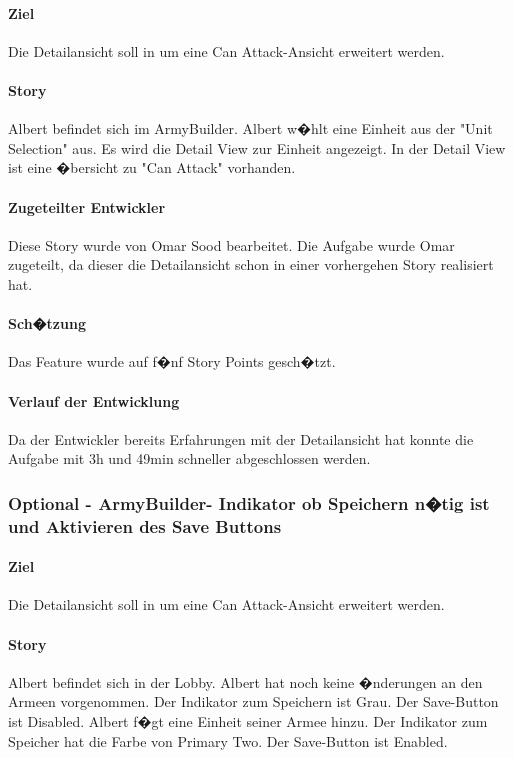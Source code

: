 \documentclass[12pt, titlepage]{scrartcl}
\begin{document}
			\paragraph{Ziel} Die Detailansicht soll in um eine \glqq Can Attack\grqq-Ansicht erweitert werden.
			\paragraph{Story} Albert befindet sich im ArmyBuilder. Albert w�hlt eine Einheit aus der "Unit Selection" aus. Es wird die Detail View zur Einheit angezeigt. In der Detail View ist eine �bersicht zu "Can Attack" vorhanden.
			\paragraph{Zugeteilter Entwickler} Diese Story wurde von Omar Sood bearbeitet. Die Aufgabe wurde Omar zugeteilt, da dieser die Detailansicht schon in einer vorhergehen Story realisiert hat.
			\paragraph{Sch�tzung}
			Das Feature wurde auf f�nf Story Points gesch�tzt.
			\paragraph{Verlauf der Entwicklung} 
			Da der Entwickler bereits Erfahrungen mit der Detailansicht hat konnte die Aufgabe mit 3h und 49min schneller abgeschlossen werden.
			
			\subsubsection{Optional - ArmyBuilder- Indikator ob Speichern n�tig ist und Aktivieren des Save Buttons}
			\paragraph{Ziel} Die Detailansicht soll in um eine \glqq Can Attack\grqq-Ansicht erweitert werden.
			\paragraph{Story} Albert befindet sich in der Lobby. Albert hat noch keine �nderungen an den Armeen vorgenommen. Der Indikator zum Speichern ist Grau. Der Save-Button ist Disabled. Albert f�gt eine Einheit seiner Armee hinzu. Der Indikator zum Speicher hat die Farbe von Primary Two. Der Save-Button ist Enabled.
\end{document}
